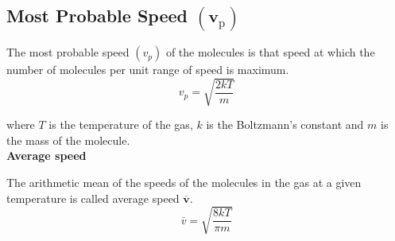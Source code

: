 \subsection{Most Probable Speed $\left(\mathbf{v}_{\mathrm{p}}\right)$}

The most probable speed $\left(v_{p}\right)$ of the molecules is that speed at which the number of molecules per unit range of speed is maximum.
$$
v_{p}=\sqrt{\frac{2 k T}{m}}
$$
\par where $T$ is the temperature of the gas, $k$ is the Boltzmann's constant and $m$ is the mass of the molecule.\\
\textbf{Average speed}
\par The arithmetic mean of the speeds of the molecules in the gas at a given temperature is called average speed $\overline{\mathbf{v}}$.
$$\bar{v}=\sqrt{\frac{8 k T}{\pi m}}$$
